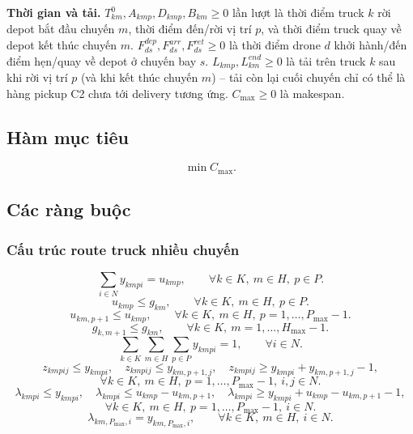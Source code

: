 \documentclass[12pt,a4paper]{article}
\begin{document}
\textbf{Thời gian và tải.} $T^0_{km}, A_{kmp}, D_{kmp}, B_{km} \ge 0$ lần lượt là
thời điểm truck $k$ rời depot bắt đầu chuyến $m$, thời điểm đến/rời vị trí $p$, và
thời điểm truck quay về depot kết thúc chuyến $m$. $F^{dep}_{ds}, F^{arr}_{ds},
F^{ret}_{ds} \ge 0$ là thời điểm drone $d$ khởi hành/đến điểm hẹn/quay về depot ở
chuyến bay $s$. $L_{kmp}, L^{end}_{km} \ge 0$ là tải trên truck $k$ sau khi rời vị trí
$p$ (và khi kết thúc chuyến $m$) -- tải còn lại cuối chuyến chỉ có thể là hàng pickup
C2 chưa tới delivery tương ứng. $C_{\max} \ge 0$ là makespan.

\subsection{Hàm mục tiêu}

\begin{equation}
  \min C_{\max}.
\end{equation}

\subsection{Các ràng buộc}

\subsubsection{Cấu trúc route truck nhiều chuyến}

\begin{equation}
  \sum_{i\in N} y_{kmpi}=u_{kmp}, \qquad \forall k\in K,\ m\in H,\ p\in P.
\end{equation}
\begin{equation}
  u_{kmp}\le g_{km}, \qquad \forall k\in K,\ m\in H,\ p\in P.
\end{equation}
\begin{equation}
  u_{km,p+1}\le u_{kmp}, \qquad \forall k\in K,\ m\in H,\ p=1,\ldots,P_{\max}-1.
\end{equation}
\begin{equation}
  g_{k,m+1}\le g_{km}, \qquad \forall k\in K,\ m=1,\ldots,H_{\max}-1.
\end{equation}
\begin{equation}
  \sum_{k\in K}\sum_{m\in H}\sum_{p\in P} y_{kmpi}=1, \qquad \forall i\in N.
\end{equation}
\begin{equation}
  z_{kmpij}\le y_{kmpi},\quad z_{kmpij}\le y_{km,p+1,j},\quad z_{kmpij}\ge y_{kmpi}+y_{km,p+1,j}-1,
\end{equation}
\[
  \forall k\in K,\ m\in H,\ p=1,\ldots,P_{\max}-1,\ i,j\in N.
\]
\begin{equation}
  \lambda_{kmpi}\le y_{kmpi},\quad \lambda_{kmpi}\le u_{kmp}-u_{km,p+1},\quad \lambda_{kmpi}\ge y_{kmpi}+u_{kmp}-u_{km,p+1}-1,
\end{equation}
\[
  \forall k\in K,\ m\in H,\ p=1,\ldots,P_{\max}-1,\ i\in N.
\]
\begin{equation}
  \lambda_{km,P_{\max},i}=y_{km,P_{\max},i}, \qquad \forall k\in K,\ m\in H,\ i\in N.
\end{equation}
\end{document}
